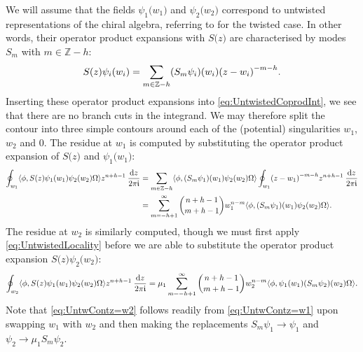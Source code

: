 \documentclass[a4paper,reqno,12pt]{report}
\theoremstyle{definition}
\numberwithin{equation}{section}
\let\originalleft\left     %
\let\originalright\right
\renewcommand{\left}{\mathopen{}\mathclose\bgroup\originalleft}
\renewcommand{\right}{\aftergroup\egroup\originalright}
\newcommand{\func}[2]{#1 \left( #2 \right)} %
\newcommand{\tfunc}[2]{#1 \bigl( #2 \bigr)} %
\newcommand{\brac}[1]{\left( #1 \right)}
\newcommand{\ZZ}{\mathbb{Z}}
\newcommand{\dd}{\mathrm{d}}   %
\newcommand{\ii}{\mathfrak{i}} %
\newcommand{\inner}[2]{\left\langle #1 , #2 \right\rangle} %
\newcommand{\ope}{operator product expansion}
\newcommand{\opes}{operator product expansions}
\theoremstyle{plain}
\begin{document}
We will assume that the fields $\tfunc{\psi_1}{w_1}$ and $\tfunc{\psi_2}{w_2}$ correspond to untwisted representations of the chiral algebra, referring to \cite{GabFus97,CanFusII15} for the twisted case.  In other words, their \opes{} with $\tfunc{S}{z}$ are characterised by modes $S_m$ with $m \in \ZZ - h$:
\begin{equation}
\func{S}{z} \func{\psi_i}{w_i} = \sum_{m \in \ZZ - h} \func{(S_m \psi_i)}{w_i} \brac{z-w_i}^{-m-h}.
\end{equation}
Inserting these \opes{} into \eqref{eq:UntwistedCoprodInt}, we see that there are no branch cuts in the integrand.  We may therefore split the contour into three simple contours around each of the (potential) singularities $w_1$, $w_2$ and $0$.  The residue at $w_1$ is computed by substituting the \ope{} of $\tfunc{S}{z}$ and $\tfunc{\psi_1}{w_1}$:
\begin{align} \label{eq:UntwContz=w1}
\oint_{w_1} \inner{\phi}{\func{S}{z} \func{\psi_1}{w_1} \func{\psi_2}{w_2} \Omega} z^{n+h-1} \: \frac{\dd z}{2 \pi \ii} &= \sum_{m \in \ZZ - h} \inner{\phi}{\func{(S_m \psi_1)}{w_1} \func{\psi_2}{w_2} \Omega} \oint_{w_1} \brac{z-w_1}^{-m-h} z^{n+h-1} \: \frac{\dd z}{2 \pi \ii} \notag \\
&= \sum_{m=-h+1}^{\infty} \binom{n+h-1}{m+h-1} w_1^{n-m} \inner{\phi}{\func{(S_m \psi_1)}{w_1} \func{\psi_2}{w_2} \Omega}.
\end{align}
The residue at $w_2$ is similarly computed, though we must first apply \eqref{eq:UntwistedLocality} before we are able to substitute the \ope{} $\tfunc{S}{z} \tfunc{\psi_2}{w_2}$:
\begin{equation} \label{eq:UntwContz=w2}
\oint_{w_2} \inner{\phi}{\func{S}{z} \func{\psi_1}{w_1} \func{\psi_2}{w_2} \Omega} z^{n+h-1} \: \frac{\dd z}{2 \pi \ii} = \mu_1 \sum_{m=-h+1}^{\infty} \binom{n+h-1}{m+h-1} w_2^{n-m} \inner{\phi}{\func{\psi_1}{w_1} \func{(S_m \psi_2)}{w_2} \Omega}.
\end{equation}
Note that \eqref{eq:UntwContz=w2} follows readily from \eqref{eq:UntwContz=w1} upon swapping $w_1$ with $w_2$ and then making the replacements $S_m \psi_1 \to \psi_1$ and $\psi_2 \to \mu_1 S_m \psi_2$.
\end{document}
